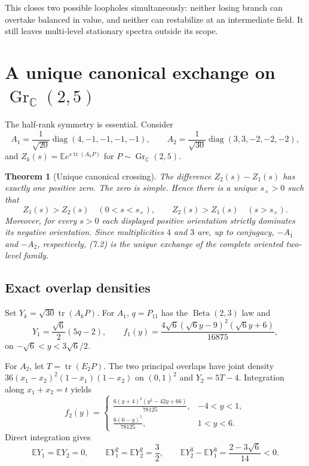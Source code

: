 \documentclass[11pt]{article}
\newtheorem{theorem}{Theorem}[section]
\newcommand{\E}{\mathbb E}
\newcommand{\C}{\mathbb C}
\newcommand{\tr}{\operatorname{tr}}
\newcommand{\Gr}{\operatorname{Gr}}
\begin{document}
This closes two possible loopholes simultaneously: neither losing branch can
overtake balanced in value, and neither can restabilize at an intermediate
field.  It still leaves multi-level stationary spectra outside its scope.

\section{A unique canonical exchange on \texorpdfstring{$\Gr_{\C}(2,5)$}{GrC(2,5)}}

The half-rank symmetry is essential.  Consider
\begin{equation}
 A_1=\frac1{\sqrt{20}}\operatorname{diag}(4,-1,-1,-1,-1),
 \qquad
 A_2=\frac1{\sqrt{30}}\operatorname{diag}(3,3,-2,-2,-2),   \tag{7.1}
\end{equation}
and $Z_k(s)=\E e^{s\tr(A_kP)}$ for $P\sim\Gr_{\C}(2,5)$.

\begin{theorem}[Unique canonical crossing]
\label{thm:crossing}
The difference $Z_2(s)-Z_1(s)$ has exactly one positive zero.  The zero is
simple.  Hence there is a unique $s_\times>0$ such that
\begin{equation}
 Z_1(s)>Z_2(s)\quad(0<s<s_\times),\qquad
 Z_2(s)>Z_1(s)\quad(s>s_\times).                            \tag{7.2}
\end{equation}
Moreover, for every $s>0$ each displayed positive orientation strictly
dominates its negative orientation.  Since multiplicities $4$ and $3$ are,
up to conjugacy, $-A_1$ and $-A_2$, respectively, (7.2) is the unique
exchange of the complete oriented two-level family.
\end{theorem}

\subsection{Exact overlap densities}

Set $Y_k=\sqrt{30}\tr(A_kP)$.  For $A_1$, $q=P_{11}$ has the
$\operatorname{Beta}(2,3)$ law and
\begin{equation}
 Y_1=\frac{\sqrt6}{2}(5q-2),\qquad
 f_1(y)=\frac{4\sqrt6(\sqrt6y-9)^2(\sqrt6y+6)}{16875},     \tag{7.3}
\end{equation}
on $-\sqrt6<y<3\sqrt6/2$.

For $A_2$, let $T=\tr(E_2P)$.  The two principal overlaps have joint density
$36(x_1-x_2)^2(1-x_1)(1-x_2)$ on $(0,1)^2$ and $Y_2=5T-4$.
Integration along $x_1+x_2=t$ yields
\begin{equation}
 f_2(y)=
 \begin{cases}
 \displaystyle\frac{6(y+4)^3(y^2-42y+66)}{78125},&-4<y<1,\\[5pt]
 \displaystyle\frac{6(6-y)^5}{78125},&1<y<6.
 \end{cases}                                               \tag{7.4}
\end{equation}
Direct integration gives
\begin{equation}
 \E Y_1=\E Y_2=0,\qquad
 \E Y_1^2=\E Y_2^2=\frac32,\qquad
 \E Y_2^3-\E Y_1^3=\frac{2-3\sqrt6}{14}<0.                \tag{7.5}
\end{equation}
\end{document}
